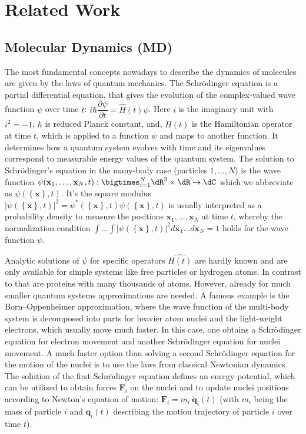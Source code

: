\section{Related Work}
\label{appsec:relatedwork}

\subsection{Molecular Dynamics (MD)} \label{app:md_md}
The most fundamental concepts nowadays to describe the dynamics of molecules are given by the laws of quantum mechanics. The Schrödinger equation is a partial differential equation, that gives the evolution of the complex-valued wave function $\psi$ over time $t$: $\displaystyle i\hbar \dfrac{\partial \psi}{\partial t} = \hat{H}(t) \psi$. Here $i$ is the imaginary unit with $i^2=-1$, $\hbar$ is reduced Planck constant, and, $\hat{H}(t)$ is the Hamiltonian operator at time $t$, which is applied to a function $\psi$ and maps to another function. It determines how a quantum system evolves with time and its eigenvalues correspond to measurable energy values of the quantum system. The solution to Schrödinger's equation in the many-body case (particles $1,\ldots,N$) is the wave function $\psi(\mathbf{x}_1,\ldots,\mathbf{x}_N, t): \bigtimes_{i=1}^N \dR^3 \times \dR \rightarrow \dC$ which we abbreviate as $\psi(\left\{ \mathbf{x} \right\}, t)$. It's the square modulus $|\psi(\left\{ \mathbf{x} \right\}, t)|^2=\psi^*(\left\{ \mathbf{x} \right\}, t) \psi(\left\{ \mathbf{x} \right\}, t)$ is usually interpreted as a probability density to measure the positions  $\mathbf{x}_1,\ldots,\mathbf{x}_N$ at time $t$, whereby the normalization condition $\int \ldots \int |\psi(\left\{ \mathbf{x} \right\}, t)|^2 d\mathbf{x}_1 \ldots d\mathbf{x}_N=1$ holds for the wave function $\psi$.

Analytic solutions of $\psi$ for specific operators $\hat{H(t)}$ are hardly known and are only available for simple systems like free particles or hydrogen atoms. In contrast to that are proteins with many thousands of atoms. However, already for much smaller quantum systems approximations are needed. A famous example is the Born–Oppenheimer approximation, where the wave function of the multi-body system is decomposed into parts for heavier atom nuclei and the light-weight electrons, which usually move much faster. In this case, one obtains a Schrödinger equation for electron movement and another Schrödinger equation for nuclei movement. A much faster option than solving a second Schrödinger equation for the motion of the nuclei is to use the laws from classical Newtonian dynamics. The solution of the first Schrödinger equation defines an energy potential, which can be utilized to obtain forces $\mathbf{F}_i$ on the nuclei and to update nuclei positions according to Newton's equation of motion: $\mathbf{F}_i=m_i \ \ddot{\mathbf{q}}_i(t)$ (with $m_i$ being the mass of particle $i$ and $\mathbf{q}_i(t)$ describing the motion trajectory of particle $i$ over time $t$).

